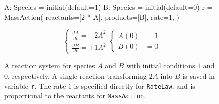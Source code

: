 \documentclass[namedate,numsec,webpdf,modern,large]{oup-authoring-template}
\theoremstyle{thmstyleone}%
\theoremstyle{thmstyletwo}%
\theoremstyle{thmstylethree}%
\newenvironment{CodeInput}{\begin{tcolorbox}[title=input,boxrule=0pt]}{\end{tcolorbox}}
\newcommand{\KeywordTok}[1]{\textcolor[rgb]{0.00,0.13,1.00}{#1}}
\newcommand{\ClassTok}[1]{\textcolor[rgb]{0.27,0.56,0.65}{#1}}
\newcommand{\OperatorTok}[1]{\textcolor[rgb]{0.00,0.00,0.00}{#1}}
\newcommand{\VariableTok}[1]{\textcolor[rgb]{0.00,0.06,0.50}{#1}}
\newcommand{\ValueTok}[1]{\textcolor[rgb]{0.13,0.57,0.41}{#1}}
\newcommand{\FunctionTok}[1]{\textcolor[rgb]{0.47,0.37,0.15}{#1}}
\newcommand{\NormalTok}[1]{\textcolor[rgb]{0.00,0.06,0.50}{#1}}
\begin{document}
\begin{figure*}[t]
\begin{minipage}[t]{\linewidth}
\begin{minipage}[c]{0.60\linewidth}
\begin{CodeInput}
\begin{Highlighting}[]
          \VariableTok{    A}: \ClassTok{Species }\OperatorTok{=}\FunctionTok{ initial}\KeywordTok{(}\VariableTok{default}\OperatorTok{=}\ValueTok{1}\KeywordTok{)}
          \VariableTok{    B}: \ClassTok{Species }\OperatorTok{=}\FunctionTok{ initial}\KeywordTok{(}\VariableTok{default}\OperatorTok{=}\ValueTok{0}\KeywordTok{)}
          \VariableTok{    r }\OperatorTok{=}\ClassTok{ MassAction}\KeywordTok{(}
          \VariableTok{        reactants}\OperatorTok{=}\KeywordTok{[}\ValueTok{2} \OperatorTok{*}\VariableTok{ A}\KeywordTok{]},
          \VariableTok{        products}\OperatorTok{=}\NormalTok{\KeywordTok{[}B\KeywordTok{]},}
          \VariableTok{        rate}\OperatorTok{=}\ValueTok{1}\NormalTok{,}
          \KeywordTok{    )}
          \end{Highlighting}
          \end{CodeInput}
      \end{minipage}%
      \begin{minipage}[c]{0.40\linewidth}
          \centering 
          \[
          \begin{cases}
              \frac{dA}{dt} = -2 A^2 \\
              \frac{dB}{dt} = +1 A^2
          \end{cases}
          \begin{cases}
              A(0) &= 1 \\
              B(0) &= 0
          \end{cases}
          \]
      \end{minipage}%
  \end{minipage}%
  
  \caption{
    A reaction system for species \(A\) and \(B\)
    with initial conditions \(1\) and \(0\), respectively. A single reaction
    transforming \(2A\) into \(B\) is saved in variable \texttt{r}. The rate
    \(1\) is specified directly for \texttt{RateLaw}, and is proportional to
    the reactants for \texttt{MassAction}.
  }
  \label{fig-simbio}
\end{figure*}
\end{document}

